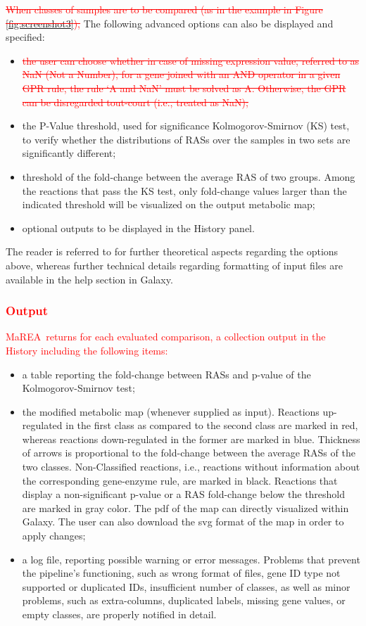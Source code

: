 \documentclass[preprint,12pt,authoryear]{elsarticle}
\newcommand{\red}{\textcolor{red}}
\newcommand{\mareaTool}{\textsf{MaREA}}
\begin{document}
\red{\sout{When classes of samples are to be compared (as in the example in Figure \ref{fig:screenshot3}),}} The following advanced options can also be displayed and specified:
\begin{itemize}
    \item \red{\sout{ the user can choose whether in case of missing expression value, referred to as NaN (Not a Number), for a gene joined with an AND operator in a given GPR rule, the rule `A and NaN' must be solved as A. Otherwise, the GPR can be disregarded tout-court (i.e., treated as NaN);}}
    \item the P-Value threshold, used for significance Kolmogorov-Smirnov (KS) test, to verify whether the distributions of RASs over the samples in two sets are significantly different;
    \item threshold of the fold-change between the average RAS of two groups. Among the reactions that pass the KS test,  only fold-change values larger than the indicated threshold will be visualized on the output metabolic map;
    \item optional outputs to be displayed in the History panel.
\end{itemize}
The reader is referred to \citep{marea} for further theoretical aspects regarding the options above, whereas further technical details regarding formatting of input files are available in the help section in Galaxy.

\red{\subsubsection{Output}}

\red{\mareaTool\ returns for each evaluated comparison, a collection output in the History including the following items:}
 \begin{itemize}
        \item a table reporting the fold-change between RASs and p-value of the Kolmogorov-Smirnov test;
        \item the modified metabolic map (whenever supplied as input). Reactions up-regulated in the first class as compared to the second class  are marked in red, whereas reactions down-regulated in the former are marked in blue.
        Thickness of arrows is proportional to the fold-change between the average RASs of the two classes. Non-Classified reactions, i.e., reactions without information about the corresponding gene-enzyme rule, are marked in black.
        Reactions that display a non-significant p-value or a RAS fold-change below the threshold are marked in gray color. The pdf of the map can directly visualized within Galaxy. The user can also download the svg format of the map in order to apply changes;
        \item a log file, reporting possible warning or error messages. Problems that prevent the pipeline's functioning, such as wrong format of files, gene ID type not supported or duplicated IDs, insufficient number of classes, as well as minor problems, such as extra-columns, duplicated labels, missing gene values, or empty classes, are properly notified in detail.

\end{itemize}
\end{document}
